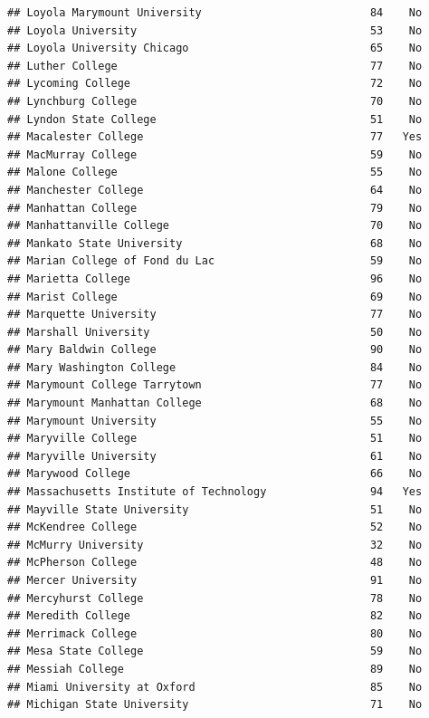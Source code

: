 \documentclass[
]{article}
\begin{document}
\begin{verbatim}
## Loyola Marymount University                          84    No
## Loyola University                                    53    No
## Loyola University Chicago                            65    No
## Luther College                                       77    No
## Lycoming College                                     72    No
## Lynchburg College                                    70    No
## Lyndon State College                                 51    No
## Macalester College                                   77   Yes
## MacMurray College                                    59    No
## Malone College                                       55    No
## Manchester College                                   64    No
## Manhattan College                                    79    No
## Manhattanville College                               70    No
## Mankato State University                             68    No
## Marian College of Fond du Lac                        59    No
## Marietta College                                     96    No
## Marist College                                       69    No
## Marquette University                                 77    No
## Marshall University                                  50    No
## Mary Baldwin College                                 90    No
## Mary Washington College                              84    No
## Marymount College Tarrytown                          77    No
## Marymount Manhattan College                          68    No
## Marymount University                                 55    No
## Maryville College                                    51    No
## Maryville University                                 61    No
## Marywood College                                     66    No
## Massachusetts Institute of Technology                94   Yes
## Mayville State University                            51    No
## McKendree College                                    52    No
## McMurry University                                   32    No
## McPherson College                                    48    No
## Mercer University                                    91    No
## Mercyhurst College                                   78    No
## Meredith College                                     82    No
## Merrimack College                                    80    No
## Mesa State College                                   59    No
## Messiah College                                      89    No
## Miami University at Oxford                           85    No
## Michigan State University                            71    No

\end{verbatim}
\end{document}
